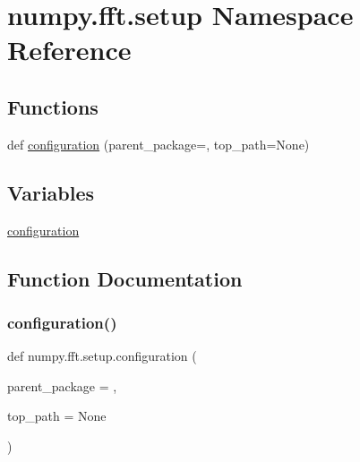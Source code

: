 \hypertarget{namespacenumpy_1_1fft_1_1setup}{}\section{numpy.\+fft.\+setup Namespace Reference}
\label{namespacenumpy_1_1fft_1_1setup}
\subsection*{Functions}
\begin{DoxyCompactItemize}
\item 
def \hyperlink{namespacenumpy_1_1fft_1_1setup_a42301326eccdb3dbd56c6004a68b747d}{configuration} (parent\+\_\+package=\textquotesingle{}\textquotesingle{}, top\+\_\+path=None)
\end{DoxyCompactItemize}
\subsection*{Variables}
\begin{DoxyCompactItemize}
\item 
\hyperlink{namespacenumpy_1_1fft_1_1setup_abab6e3449ad355bfdfa411f0808bc545}{configuration}
\end{DoxyCompactItemize}


\subsection{Function Documentation}
\mbox{\label{namespacenumpy_1_1fft_1_1setup_a42301326eccdb3dbd56c6004a68b747d}} 
\subsubsection{\texorpdfstring{configuration()}{configuration()}}
{\footnotesize\ttfamily def numpy.\+fft.\+setup.\+configuration (\begin{DoxyParamCaption}\item[{}]{parent\+\_\+package = {\ttfamily \textquotesingle{}\textquotesingle{}},  }\item[{}]{top\+\_\+path = {\ttfamily None} }\end{DoxyParamCaption})}



